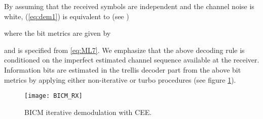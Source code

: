 \documentclass{article}
\begin{document}
By assuming that the received symbols are independent and the channel noise is white, (\ref{eq:dem1}) is equivalent to (see \cite{muq1})

where the bit metrics  are given by

and  is specified from \eqref{eq:ML7}.
We emphasize that the above decoding rule is conditioned on the imperfect estimated channel sequence  available at the receiver. Information bits are estimated in the trellis decoder part from the above bit metrics by applying either non-iterative or turbo procedures (see figure \ref{fig2}).    

\begin{figure}[!htb]
\centering
\texttt{[image: BICM\_RX]}
\caption{BICM iterative demodulation with CEE.}\label{fig2}
\end{figure}       
\end{document}
